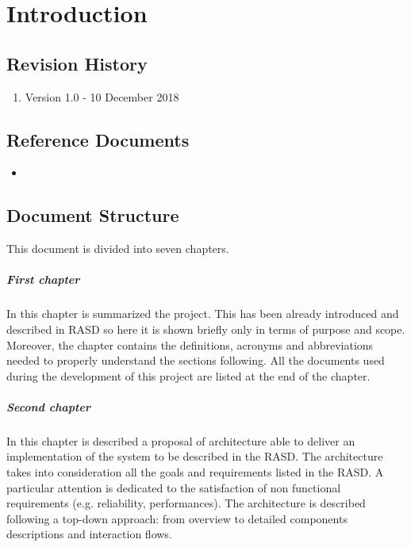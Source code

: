 \documentclass[../DD.tex]{subfiles}
\begin{document}
\chapter{Introduction}
\thispagestyle{fancy}
		
		
		
		
		
		\section{Revision History}
		\begin{enumerate}
			\item Version 1.0 - 10 December 2018
		\end{enumerate}
		
		\section{Reference Documents}
			\begin{itemize}
				\item {}
			\end{itemize}
			
		\section{Document Structure}
		This document is divided into seven chapters.
		
		\paragraph{First chapter}
		In this chapter is summarized the project. This has been already introduced and described in RASD so here it is shown briefly only in terms of purpose and scope. Moreover, the chapter contains the definitions, acronyms and abbreviations needed to properly understand the sections following. All the documents used during the development of this project are listed at the end of the chapter.
		\paragraph{Second chapter}
			In this chapter is described a proposal of architecture able to deliver an implementation of the system to be described in the RASD. The architecture takes into consideration all the goals and requirements listed in the RASD. A particular attention is dedicated to the satisfaction of non functional requirements (e.g. reliability, performances). The architecture is described following a top-down approach: from overview to detailed components descriptions and interaction flows.
\end{document}
